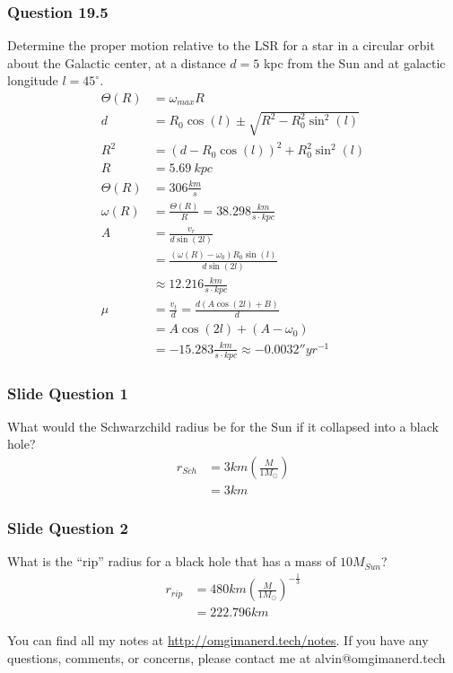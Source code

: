 \documentclass{math}
\begin{document}
\subsubsection*{Question 19.5}
Determine the proper motion relative to the LSR for a star in a circular orbit
about the Galactic center, at a distance \( d = 5 \) kpc from the Sun and at
galactic longitude \( l = 45^{\circ} \).
\begin{align*}
  \Theta(R) &= \omega_{max}R \\
  d &= R_0\cos(l)\pm\sqrt{R^2-R_0^2\sin^2(l)} \\
  R^2 &= (d-R_0\cos(l))^2+R_0^2\sin^2(l) \\
  R &= 5.69~kpc \\
  \Theta(R) &= 306\frac{km}{s} \\
  \omega(R) &= \frac{\Theta(R)}{R} = 38.298\frac{km}{s\cdot kpc} \\
  A &= \frac{v_r}{d\sin(2l)} \\
  &= \frac{(\omega(R)-\omega_0)R_0\sin(l)}{d\sin(2l)} \\
  &\approx 12.216\frac{km}{s\cdot kpc} \\
  \mu &= \frac{v_t}{d} = \frac{d(A\cos(2l)+B)}{d} \\
  &= A\cos(2l)+(A-\omega_0) \\
  &= -15.283\frac{km}{s\cdot kpc} \approx -0.0032''yr^{-1}
\end{align*}

\subsubsection*{Slide Question 1}
What would the Schwarzchild radius be for the Sun if it collapsed into a black
hole?
\begin{align*}
  r_{Sch} &= 3km\left(\frac{M}{1M_{\odot}}\right) \\
  &= 3km
\end{align*}

\subsubsection*{Slide Question 2}
What is the ``rip'' radius for a black hole that has a mass of \( 10 M_{Sun} \)?
\begin{align*}
  r_{rip} &= 480km\left(\frac{M}{1M_{\odot}}\right)^{-\frac{1}{3}} \\
  &= 222.796km
\end{align*}

\begin{center}
  You can find all my notes at \url{http://omgimanerd.tech/notes}. If you have
  any questions, comments, or concerns, please contact me at
  alvin@omgimanerd.tech
\end{center}
\end{document}
